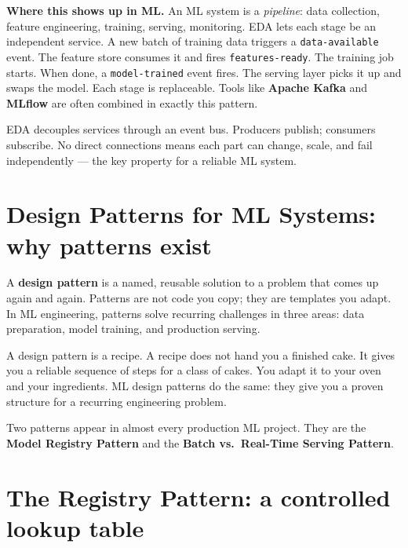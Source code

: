 \documentclass[a4paper,11pt]{article}
\newcommand{\vocab}[1]{\textbf{\color{navy}#1}}
\begin{document}
\noindent\textbf{Where this shows up in ML.}
An ML system is a \emph{pipeline}: data collection, feature engineering,
training, serving, monitoring. EDA lets each stage be an independent service.
A new batch of training data triggers a \texttt{data-available} event.
The feature store consumes it and fires \texttt{features-ready}.
The training job starts. When done, a \texttt{model-trained} event fires.
The serving layer picks it up and swaps the model. Each stage is replaceable.
Tools like \textbf{Apache Kafka} and \textbf{MLflow} are often combined
in exactly this pattern.

\begin{keytake}
EDA decouples services through an event bus. Producers publish; consumers
subscribe. No direct connections means each part can change, scale, and fail
independently --- the key property for a reliable ML system.
\end{keytake}

\section{Design Patterns for ML Systems: why patterns exist}

A \vocab{design pattern} is a named, reusable solution to a problem that comes
up again and again. Patterns are not code you copy; they are templates you
adapt. In ML engineering, patterns solve recurring challenges in three areas:
data preparation, model training, and production serving.

\begin{intuition}
A design pattern is a recipe. A recipe does not hand you a finished cake.
It gives you a reliable sequence of steps for a class of cakes.
You adapt it to your oven and your ingredients. ML design patterns do the
same: they give you a proven structure for a recurring engineering problem.
\end{intuition}

Two patterns appear in almost every production ML project.
They are the \textbf{Model Registry Pattern} and the
\textbf{Batch vs.\ Real-Time Serving Pattern}.

\section{The Registry Pattern: a controlled lookup table}
\end{document}
